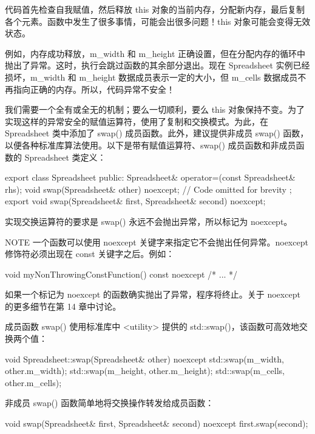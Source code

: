 代码首先检查自我赋值，然后释放 this 对象的当前内存，分配新内存，最后复制各个元素。函数中发生了很多事情，可能会出很多问题！this 对象可能会变得无效状态。

例如，内存成功释放，m\_width 和 m\_height 正确设置，但在分配内存的循环中抛出了异常。这时，执行会跳过函数的其余部分退出。现在 Spreadsheet 实例已经损坏，m\_width 和 m\_height 数据成员表示一定的大小，但 m\_cells 数据成员不再指向正确的内存。所以，代码异常不安全！

我们需要一个全有或全无的机制；要么一切顺利，要么 this 对象保持不变。为了实现这样的异常安全的赋值运算符，使用了复制和交换模式。为此，在 Spreadsheet 类中添加了 swap() 成员函数。此外，建议提供非成员 swap() 函数，以便各种标准库算法使用。以下是带有赋值运算符、swap() 成员函数和非成员函数的 Spreadsheet 类定义：

\begin{cpp}
export class Spreadsheet
{
    public:
        Spreadsheet& operator=(const Spreadsheet& rhs);
        void swap(Spreadsheet& other) noexcept;
        // Code omitted for brevity
};
export void swap(Spreadsheet& first, Spreadsheet& second) noexcept;
\end{cpp}

实现交换运算符的要求是 swap() 永远不会抛出异常，所以标记为 noexcept。

\begin{myNotic}{NOTE}
一个函数可以使用 noexcept 关键字来指定它不会抛出任何异常。noexcept 修饰符必须出现在 const 关键字之后。例如：

\begin{cpp}
void myNonThrowingConstFunction() const noexcept { /* ... */ }
\end{cpp}

如果一个标记为 noexcept 的函数确实抛出了异常，程序将终止。关于 noexcept 的更多细节在第 14 章中讨论。
\end{myNotic}

成员函数 swap() 使用标准库中 <utility> 提供的 std::swap()，该函数可高效地交换两个值：

\begin{cpp}
void Spreadsheet::swap(Spreadsheet& other) noexcept
{
    std::swap(m_width, other.m_width);
    std::swap(m_height, other.m_height);
    std::swap(m_cells, other.m_cells);
}
\end{cpp}

非成员 swap() 函数简单地将交换操作转发给成员函数：

\begin{cpp}
void swap(Spreadsheet& first, Spreadsheet& second) noexcept
{
    first.swap(second);
}
\end{cpp}

